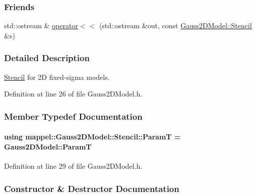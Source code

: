 \subsubsection*{Friends}
\begin{DoxyCompactItemize}
\item 
std\+::ostream \& \hyperlink{classmappel_1_1Gauss2DModel_1_1Stencil_a1b20b928af844d0e46c5eaa5e88543e2}{operator$<$$<$} (std\+::ostream \&out, const \hyperlink{classmappel_1_1Gauss2DModel_1_1Stencil}{Gauss2\+D\+Model\+::\+Stencil} \&s)
\end{DoxyCompactItemize}


\subsubsection{Detailed Description}
\hyperlink{classmappel_1_1Gauss2DModel_1_1Stencil}{Stencil} for 2D fixed-\/sigma models. 

Definition at line 26 of file Gauss2\+D\+Model.\+h.



\subsubsection{Member Typedef Documentation}
\paragraph[{\texorpdfstring{ParamT}{ParamT}}]{\setlength{\rightskip}{0pt plus 5cm}using {\bf mappel\+::\+Gauss2\+D\+Model\+::\+Stencil\+::\+ParamT} =  {\bf Gauss2\+D\+Model\+::\+ParamT}}\hypertarget{classmappel_1_1Gauss2DModel_1_1Stencil_af4899fe2829b3bf1c685cd6bfd1b602e}{}\label{classmappel_1_1Gauss2DModel_1_1Stencil_af4899fe2829b3bf1c685cd6bfd1b602e}


Definition at line 29 of file Gauss2\+D\+Model.\+h.



\subsubsection{Constructor \& Destructor Documentation}

